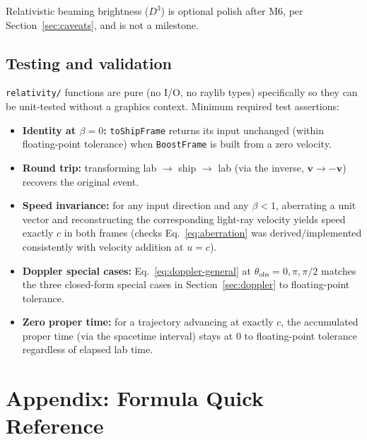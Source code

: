 \documentclass[11pt]{article}
\newcommand{\vb}[1]{\mathbf{#1}}
\begin{document}
Relativistic beaming brightness ($D^3$) is optional polish after M6, per Section~\ref{sec:caveats}, and is not a milestone.

\subsection{Testing and validation}
\label{sec:testing}
\texttt{relativity/} functions are pure (no I/O, no raylib types) specifically so they can be unit-tested without a graphics context. Minimum required test assertions:
\begin{itemize}[leftmargin=1.5em]
  \item \textbf{Identity at $\beta=0$:} \texttt{toShipFrame} returns its input unchanged (within floating-point tolerance) when \texttt{BoostFrame} is built from a zero velocity.
  \item \textbf{Round trip:} transforming lab $\to$ ship $\to$ lab (via the inverse, $\vb v \to -\vb v$) recovers the original event.
  \item \textbf{Speed invariance:} for any input direction and any $\beta<1$, aberrating a unit vector and reconstructing the corresponding light-ray velocity yields speed exactly $c$ in both frames (checks Eq.~\eqref{eq:aberration} was derived/implemented consistently with velocity addition at $u=c$).
  \item \textbf{Doppler special cases:} Eq.~\eqref{eq:doppler-general} at $\theta_{\text{obs}}=0,\pi,\pi/2$ matches the three closed-form special cases in Section~\ref{sec:doppler} to floating-point tolerance.
  \item \textbf{Zero proper time:} for a trajectory advancing at exactly $c$, the accumulated proper time (via the spacetime interval) stays at $0$ to floating-point tolerance regardless of elapsed lab time.
\end{itemize}

\section*{Appendix: Formula Quick Reference}
\end{document}
